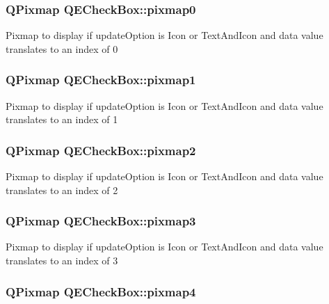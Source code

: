 \hypertarget{classQECheckBox_aae33c34105700e7c6d38bdb10b81b7b8}{
\subsubsection[{pixmap0}]{\setlength{\rightskip}{0pt plus 5cm}QPixmap QECheckBox::pixmap0}}
\label{classQECheckBox_aae33c34105700e7c6d38bdb10b81b7b8}
Pixmap to display if updateOption is Icon or TextAndIcon and data value translates to an index of 0 \hypertarget{classQECheckBox_a8397e5fc7e993fa152ae60f1c7cf1400}{
\subsubsection[{pixmap1}]{\setlength{\rightskip}{0pt plus 5cm}QPixmap QECheckBox::pixmap1}}
\label{classQECheckBox_a8397e5fc7e993fa152ae60f1c7cf1400}
Pixmap to display if updateOption is Icon or TextAndIcon and data value translates to an index of 1 \hypertarget{classQECheckBox_a5605d3d4c7bef8cdb45efe5656c134b9}{
\subsubsection[{pixmap2}]{\setlength{\rightskip}{0pt plus 5cm}QPixmap QECheckBox::pixmap2}}
\label{classQECheckBox_a5605d3d4c7bef8cdb45efe5656c134b9}
Pixmap to display if updateOption is Icon or TextAndIcon and data value translates to an index of 2 \hypertarget{classQECheckBox_a633d366aed7204a0d7e5e2f6840dc742}{
\subsubsection[{pixmap3}]{\setlength{\rightskip}{0pt plus 5cm}QPixmap QECheckBox::pixmap3}}
\label{classQECheckBox_a633d366aed7204a0d7e5e2f6840dc742}
Pixmap to display if updateOption is Icon or TextAndIcon and data value translates to an index of 3 \hypertarget{classQECheckBox_aa08f0755f6cedb8e5853bae3a38c9ae4}{
\subsubsection[{pixmap4}]{\setlength{\rightskip}{0pt plus 5cm}QPixmap QECheckBox::pixmap4}}
